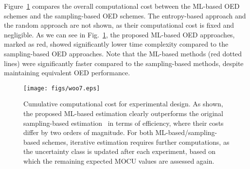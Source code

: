 \documentclass{article}
\begin{document}
Figure~\ref{fig7} compares the overall computational cost between the ML-based OED schemes and the sampling-based OED schemes. The entropy-based approach and the random approach are not shown, as their computational cost is fixed and negligible. As we can see in Fig.~\ref{fig7}, the proposed ML-based OED approaches, marked as red, showed significantly lower time complexity compared to the sampling-based OED approaches. Note that the ML-based methods (red dotted lines) were significantly faster compared to the sampling-based methods, despite maintaining equivalent OED performance.
\begin{figure}
\centering
\texttt{[image: figs/woo7.eps]}
\caption{Cumulative computational cost for experimental design. As shown, the proposed ML-based estimation clearly outperforms the original sampling-based estimation~\cite{Hong2021} in terms of efficiency, where their costs differ by two orders of magnitude. For both ML-based/sampling-based schemes, iterative estimation requires further computations, as the uncertainty class is updated after each experiment, based on which the remaining expected MOCU values are assessed again.}
\label{fig7}
\end{figure}
\end{document}
